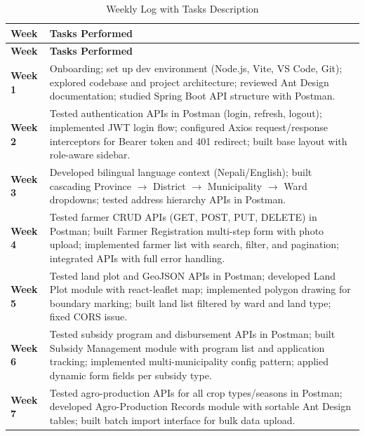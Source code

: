 \documentclass[12pt,a4paper]{report}
\begin{document}
\begin{longtable}{|p{2.8cm}|p{11cm}|}
\caption{Weekly Log with Tasks Description} \label{tab:weekly_log} \\
\hline
\textbf{Week} & \textbf{Tasks Performed} \\
\hline
\endfirsthead
\hline
\textbf{Week} & \textbf{Tasks Performed} \\
\hline
\endhead

\textbf{Week 1}
 &
Onboarding; set up dev environment (Node.js, Vite, VS Code, Git);
explored codebase and project architecture; reviewed Ant Design documentation;
studied Spring Boot API structure with Postman. \\
\hline

\textbf{Week 2}
 &
Tested authentication APIs in Postman (login, refresh, logout);
implemented JWT login flow; configured Axios request/response interceptors
for Bearer token and 401 redirect; built base layout with role-aware sidebar. \\
\hline

\textbf{Week 3}
 &
Developed bilingual language context (Nepali/English);
built cascading Province $\to$ District $\to$ Municipality $\to$ Ward dropdowns;
tested address hierarchy APIs in Postman. \\
\hline

\textbf{Week 4}
 &
Tested farmer CRUD APIs (GET, POST, PUT, DELETE) in Postman;
built Farmer Registration multi-step form with photo upload;
implemented farmer list with search, filter, and pagination;
integrated APIs with full error handling. \\
\hline

\textbf{Week 5}
 &
Tested land plot and GeoJSON APIs in Postman;
developed Land Plot module with react-leaflet map;
implemented polygon drawing for boundary marking;
built land list filtered by ward and land type; fixed CORS issue. \\
\hline

\textbf{Week 6}
 &
Tested subsidy program and disbursement APIs in Postman;
built Subsidy Management module with program list and application tracking;
implemented multi-municipality config pattern;
applied dynamic form fields per subsidy type. \\
\hline

\textbf{Week 7}
 &
Tested agro-production APIs for all crop types/seasons in Postman;
developed Agro-Production Records module with sortable Ant Design tables;
built batch import interface for bulk data upload. \\
\hline


\end{longtable}
\end{document}
